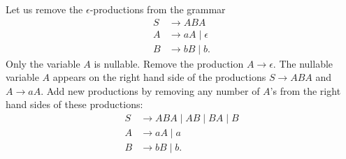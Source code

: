 

\setcounter{section}{5}
\setcounter{subsection}{2}
\setcounter{dfn}{9}

\begin{exl}
Let us remove the $\epsilon$-productions from the grammar
\begin{align*}
S &\to ABA\\
A &\to aA \mid \epsilon\\
B &\to bB \mid b.
\end{align*}
Only the variable $A$ is nullable.
Remove the production $A \to \epsilon$.
The nullable variable $A$ appears on the right hand side of the productions $S \to ABA$ and $A \to aA$.
Add new productions by removing any number of $A$'s from the right hand sides of these productions:
\begin{align*}
S &\to ABA \mid AB \mid BA \mid B\\
A &\to aA \mid a\\
B &\to bB \mid b.
\end{align*}
\end{exl}

